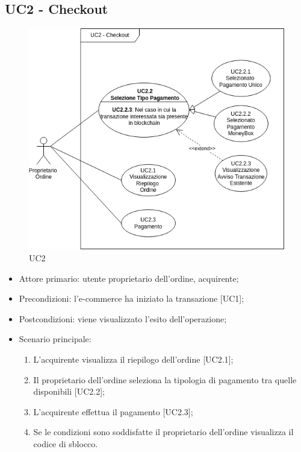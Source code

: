 \subsection{UC2 - Checkout}\label{subsection: UC2}

\begin{figure}[H]
    \centering
    \includegraphics[scale=0.8]{immagini/UC2.png}
    \caption{UC2}
\end{figure}

\begin{itemize}
    \item Attore primario: utente proprietario dell'ordine, acquirente;
    \item Precondizioni: l'e-commerce\glo{} ha iniziato la transazione [UC1];
    \item Postcondizioni: viene visualizzato l'esito dell'operazione;
    \item Scenario principale:
    \begin{enumerate}
        \item L'acquirente visualizza il riepilogo dell'ordine [UC2.1];
        \item Il proprietario dell'ordine seleziona la tipologia di pagamento tra quelle disponibili [UC2.2];
        \item L'acquirente effettua il pagamento [UC2.3];
        \item Se le condizioni sono soddisfatte il proprietario dell'ordine visualizza il codice di sblocco.
    \end{enumerate}
\end{itemize}

